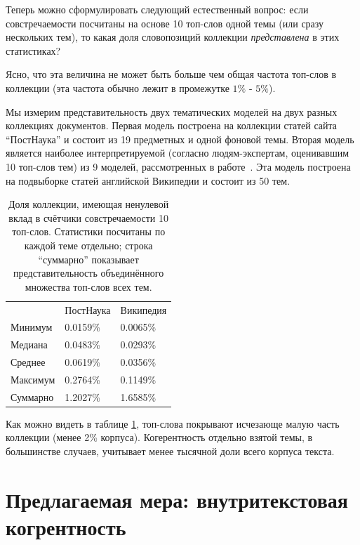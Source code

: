 Теперь можно сформулировать следующий естественный вопрос: если совстречаемости посчитаны на основе 10 топ-слов одной темы (или сразу нескольких тем), то какая доля словопозиций коллекции \textit{представлена} в этих статистиках?

Ясно, что эта величина не может быть больше чем общая частота топ-слов в коллекции (эта частота обычно лежит в промежутке $1\%$ - $5\%$).


Мы измерим представительность двух тематических моделей на двух разных коллекциях документов. Первая модель построена на коллекции статей сайта ``ПостНаука'' и состоит из 19 предметных и одной фоновой темы. Вторая модель является наиболее интерпретируемой (согласно людям-экспертам, оценивавшим 10 топ-слов тем) из 9 моделей, рассмотренных в работе~\cite{rtl}. Эта модель построена на подвыборке статей английской Википедии и состоит из 50 тем.

\begin{table}[ht]
\begin{tabular}{lll}
         & ПостНаука & Википедия \\
Минимум  & 0.0159\%  & 0.0065\%  \\
Медиана  & 0.0483\%  & 0.0293\%  \\
Среднее  & 0.0619\%  & 0.0356\%  \\
Максимум & 0.2764\%  & 0.1149\%  \\
Суммарно & 1.2027\%  & 1.6585\% 
\end{tabular}
    \caption{
      Доля коллекции, имеющая ненулевой вклад в счётчики совстречаемости 10 топ-слов. Статистики посчитаны по каждой теме отдельно; строка ``суммарно'' показывает представительность объединённого множества топ-слов всех тем.
    }
    \label{table:represented}
\end{table}

Как можно видеть в таблице \ref{table:represented}, топ-слова покрывают исчезающе малую часть коллекции (менее 2\% корпуса). Когерентность отдельно взятой темы, в большинстве случаев, учитывает менее тысячной доли всего корпуса текста.


\section{Предлагаемая мера: внутритекстовая когрентность}

